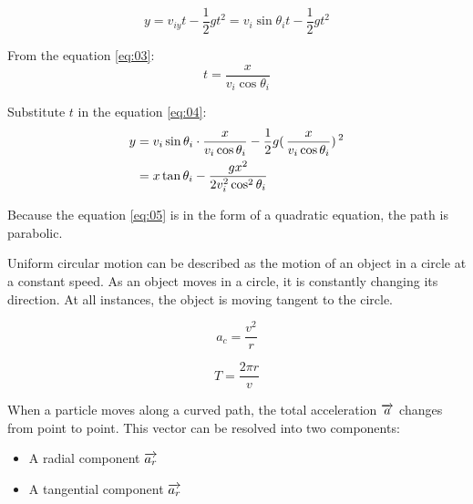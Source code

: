             \begin{equation}
                \label{eq:04}
                y = v_{iy}t - \frac{1}{2}gt^{2} = v_{i}\sin\theta_{i}t - \frac{1}{2}gt^{2}
            \end{equation}


            \par From the equation \eqref{eq:03}:
            \begin{equation}
                t = \frac{x}{v_{i}\cos\theta_{i}}
            \end{equation}

            \par Substitute $t$ in the equation \eqref{eq:04}:
            \begin{equation}
                \begin{aligned}
                \label{eq:05}
                    y &= v_{i}\sin\theta_{i} \cdot \frac{x}{v_{i}\cos\theta_{i}}
                    - \frac{1}{2}g (\,\frac{x}{v_{i}\cos\theta_{i}})\,^{2} \\
                    &= x\tan{\theta_{i}} - \frac{gx^{2}}{2v^{2}_{i}\cos^{2}\theta_{i}}
                \end{aligned}
            \end{equation}

            Because the equation \eqref{eq:05} is in the form of a quadratic equation,
            the path is parabolic.

    \pagebreak

            Uniform circular motion can be described as the motion of an object in a circle
            at a constant speed. As an object moves in a circle, it is constantly changing
            its direction. At all instances, the object is moving tangent to the circle.

            \begin{equation}
                a_{c} = \frac{v^{2}}{r}
            \end{equation}

            \begin{equation}
                T = \frac{2\pi r}{v}
            \end{equation}

    \pagebreak
    
            \par When a particle moves along a curved path, the total acceleration $\overrightarrow{a}$ 
            changes from point to point. This vector can be resolved into two components:
            \begin{itemize}
                \item A radial component $\overrightarrow{a_{r}}$
                \item A tangential component $\overrightarrow{a_{r}}$
            \end{itemize}

